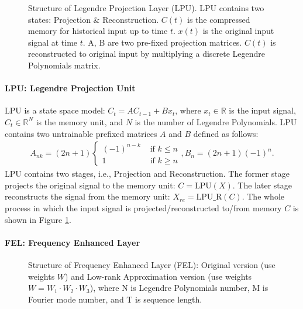 \documentclass{article}
\def \R {\mathbb{R}}
\begin{document}
\begin{figure}[t]
\begin{minipage}{\linewidth}
    \centering
\end{minipage}
\caption{Structure of Legendre Projection Layer (LPU). LPU contains two states: Projection \& Reconstruction. $C(t)$ is the compressed memory for historical input up to time $t$. $x(t)$ is the original input signal at time $t$. A, B are two pre-fixed projection matrices. $C(t)$ is reconstructed to original input by multiplying a discrete Legendre Polynomials matrix.}
    \label{fig:LPL}
\vskip -0.1in
\end{figure}

\paragraph{LPU: Legendre Projection Unit} LPU is a state space model: $C_t = AC_{t-1} + Bx_t$, where $x_t \in \R$ is the input signal, $C_t \in \R^N$ is the memory unit, and $N$ is the number of Legendre Polynomials. LPU contains two untrainable prefixed matrices $A$ and $B$ defined as follows:
\begin{align}
A_{n k}=(2 n+1) \begin{cases}(-1)^{n-k} & \text { if } k \leq n \\ 1 & \text { if } k \geq n\end{cases}, 
B_{n}=(2 n+1)(-1)^{n}. 
\label{equ:LPU_A_B}
\end{align}
LPU contains two stages, i.e., Projection and Reconstruction. The former stage projects the original signal to the memory unit: $C=\mathrm{LPU}(X)$. The later stage reconstructs the signal from the memory unit: $X_{re}=\mathrm{LPU\_R}(C)$. The whole process in which the input signal is projected/reconstructed to/from memory $C$ is shown in Figure \ref{fig:LPL}.


\paragraph{FEL: Frequency Enhanced Layer} \begin{figure}[t]
    \begin{minipage}{\linewidth}
     \centering
    \end{minipage}
    \caption{Structure of Frequency Enhanced Layer (FEL): Original version (use weights $W$) and Low-rank Approximation version (use weights $W=W_1 \cdot W_2 \cdot W_3$), where N is Legendre Polynomials number, M is Fourier mode number, and T is sequence length.}
    \label{fig:FEL}
\vskip -0.1in
\end{figure}
\end{document}
